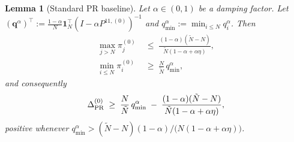 \documentclass{article}
\theoremstyle{plain}
\newtheorem{lemma}[theorem]{Lemma}
\theoremstyle{definition}
\def\tp{\intercal}
\begin{document}
\begin{lemma}[Standard PR baseline]\label{lem:pagerank-combined}
	Let $\alpha \in (0,1)$ be a damping factor. 
	Let $(\mathbf{q}^\alpha)^\tp := \tfrac{1-\alpha}{N}\mathbf{1}_N^\tp(I-\alpha P^{11,(0)})^{-1}$ and $q_{\min}^\alpha := \min_{i\leq N}q_i^\alpha$. Then
	\begin{align}
		\max_{j > N}\pi_j^{(0)} \;&\leq\; \frac{(1-\alpha)(\tilde{N}-N)}{\tilde{N}(1-\alpha+\alpha\eta)}, \label{eq:PR-max-leakage}\\
		\min_{i \leq N}\pi_i^{(0)} \;&\geq\; \frac{N}{\tilde{N}}\,q_{\min}^\alpha, \label{eq:PR-min-block1}
	\end{align}
	and consequently
	\begin{equation}\label{eq:PR-gap-lemma}
		\Delta^{(0)}_{\textnormal{PR}} \;\geq\; \frac{N}{\tilde{N}}\,q_{\min}^\alpha \;-\; \frac{(1-\alpha)(\tilde{N}-N)}{\tilde{N}(1-\alpha+\alpha\eta)},
	\end{equation}
	positive whenever $q_{\min}^\alpha > (\tilde{N}-N)(1-\alpha)/\bigl(N(1-\alpha+\alpha\eta)\bigr)$.
\end{lemma}
\end{document}
